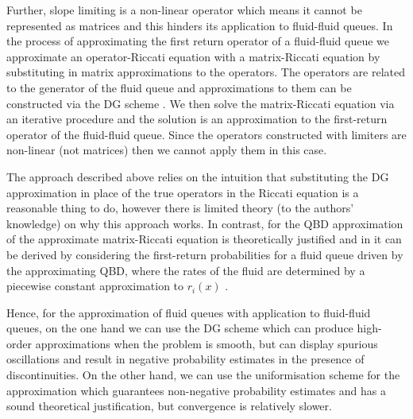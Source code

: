Further, slope limiting is a non-linear operator which means it cannot be represented as matrices and this hinders its application to fluid-fluid queues. %
In the process of approximating the first return operator of a fluid-fluid queue we approximate an operator-Riccati equation with a matrix-Riccati equation by substituting in matrix approximations to the operators. The operators are related to the generator of the fluid queue and approximations to them can be constructed via the DG scheme \citep{blnos2022}. We then solve the matrix-Riccati equation via an iterative procedure \citep{bean2005b,blnos2022} and the solution is an approximation to the first-return operator of the fluid-fluid queue. Since the operators constructed with limiters are non-linear (not matrices) then we cannot apply them in this case. %

The approach described above relies on the intuition that substituting the DG approximation in place of the true operators in the Riccati equation is a reasonable thing to do, however there is limited theory (to the authors' knowledge) on why this approach works. In contrast, for the QBD approximation of \cite{bo2013} the approximate matrix-Riccati equation is theoretically justified and in it can be derived by considering the first-return probabilities for a fluid queue driven by the approximating QBD, where the rates of the fluid are determined by a piecewise constant approximation to \(r_i(x)\) \citep{bean2005}. 

Hence, for the approximation of fluid queues with application to fluid-fluid queues, on the one hand we can use the DG scheme which can produce high-order approximations when the problem is smooth, but can display spurious oscillations and result in negative probability estimates in the presence of discontinuities. On the other hand, we can use the uniformisation scheme for the approximation which guarantees non-negative probability estimates and has a sound theoretical justification, but convergence is relatively slower. 

